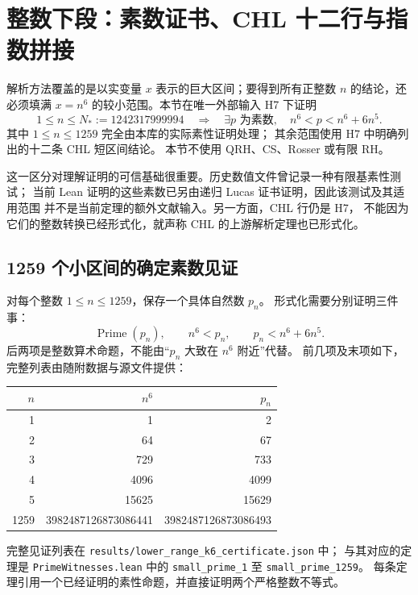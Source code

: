 \section{整数下段：素数证书、CHL 十二行与指数拼接}
\label{sec:lower}

解析方法覆盖的是以实变量 $x$ 表示的巨大区间；要得到所有正整数 $n$
的结论，还必须填满 $x=n^6$ 的较小范围。本节在唯一外部输入 H7 下证明
\begin{equation}\label{lower:target}
 1\leq n\leq N_*:=1242317999994
 \quad\Longrightarrow\quad
 \exists p\text{ 为素数},\quad n^6<p<n^6+6n^5.
\end{equation}
其中 $1\leq n\leq1259$ 完全由本库的实际素性证明处理；
其余范围使用 H7 中明确列出的十二条 CHL 短区间结论。
本节不使用 QRH、CS、Rosser 或有限 RH。

这一区分对理解证明的可信基础很重要。历史数值文件曾记录一种有限基素性测试；
当前 Lean 证明的这些素数已另由递归 Lucas 证书证明，因此该测试及其适用范围
并不是当前定理的额外文献输入。另一方面，CHL 行仍是 H7，
不能因为它们的整数转换已经形式化，就声称 CHL 的上游解析定理也已形式化。

\subsection{1259 个小区间的确定素数见证}

对每个整数 $1\leq n\leq1259$，保存一个具体自然数 $p_n$。
形式化需要分别证明三件事：
\begin{equation}\label{lower:witness-obligations}
 \operatorname{Prime}(p_n),\qquad n^6<p_n,\qquad
 p_n<n^6+6n^5.
\end{equation}
后两项是整数算术命题，不能由“$p_n$ 大致在 $n^6$ 附近”代替。
前几项及末项如下，完整列表由随附数据与源文件提供：
\begin{center}
\begin{tabular}{r|r|r}
$n$ & $n^6$ & $p_n$\\\hline
1 & 1 & 2\\
2 & 64 & 67\\
3 & 729 & 733\\
4 & 4096 & 4099\\
5 & 15625 & 15629\\
1259 & 3982487126873086441 & 3982487126873086493
\end{tabular}
\end{center}
完整见证列表在 \texttt{results/lower\_range\_k6\_certificate.json} 中；
与其对应的定理是 \texttt{PrimeWitnesses.lean} 中的
\texttt{small\_prime\_1} 至 \texttt{small\_prime\_1259}。
每条定理引用一个已经证明的素性命题，并直接证明两个严格整数不等式。

